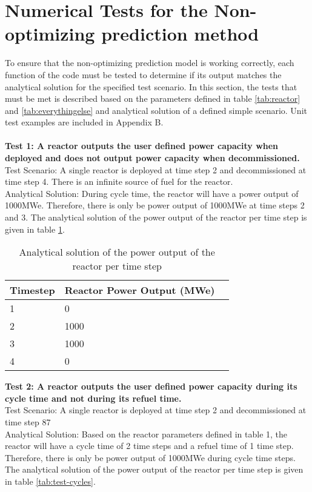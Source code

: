 \documentclass[12pt,letterpaper]{article}
\begin{document}
\newpage

\section{Numerical Tests for the Non-optimizing prediction method}
To ensure that the non-optimizing prediction model is working correctly, each function of the code must be tested to determine if its output matches the analytical solution for the specified test scenario. In this section, the tests that must be met is described based on the parameters defined in table \ref{tab:reactor} and \ref{tab:everythingelse} and analytical solution of a defined simple scenario. Unit test examples are included in Appendix B.
\\
\\
\noindent
\textbf{Test 1: A reactor outputs the user defined power capacity when deployed and does not output
power capacity when decommissioned.} \\
Test Scenario: A single reactor is deployed at time step 2 and decommissioned at time step 4. There is an infinite source of fuel for the reactor. \\
Analytical Solution: During cycle time, the reactor will have a power output of 1000MWe. Therefore,
there is only be power output of 1000MWe at time steps 2 and 3. The analytical solution of
the power output of the reactor per time step is given in table \ref{tab:test-power}.

\begin{table}[H]
     \centering
    \begin{tabularx}{\textwidth}{bbb}
       \hline
       Timestep & Reactor Power Output (MWe) \\
       \hline
       1 & 0 \\
       2 & 1000 \\
       3 & 1000 \\
       4 & 0 \\
       \hline
    \end{tabularx}
    \caption {Analytical solution of the power output of the reactor per time step}
    \label{tab:test-power}
\end{table}

\noindent
\textbf{Test 2: A reactor outputs the user defined power capacity during its cycle time and not during its refuel time.} \\
Test Scenario: A single reactor is deployed at time step 2 and decommissioned at time step 87 \\
Analytical Solution: Based on the reactor parameters defined in table 1, the reactor will have a cycle time of 2 time steps and a refuel time of 1 time step. Therefore, there is only be power output of 1000MWe during cycle time steps. The analytical solution of the power output of the reactor per time step is given in table \ref{tab:test-cycles}.
\end{document}
